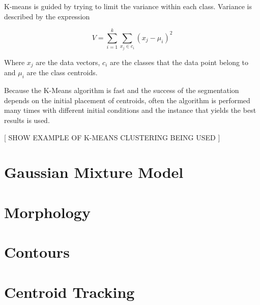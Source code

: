 K-means is guided by trying to limit the variance within each class. Variance is described by the expression

\begin{equation}\label{eq:2}
   V = \sum_{i=1}^k\sum_{x_j\in c_i}(x_j-\mu_i)^2 
\end{equation}

Where {$x_j$} are the data vectors, $c_i$ are the classes that the data point belong to and $\mu_i$ are the class centroids.

Because the K-Means algorithm is fast and the success of the segmentation depends on the initial placement of centroids, often the algorithm is performed many times with different initial conditions and the instance that yields the best results is used. 


[ SHOW EXAMPLE OF K-MEANS CLUSTERING BEING USED ]
\section{Gaussian Mixture Model}


\section{Morphology}

\section{Contours}

\section{Centroid Tracking}


